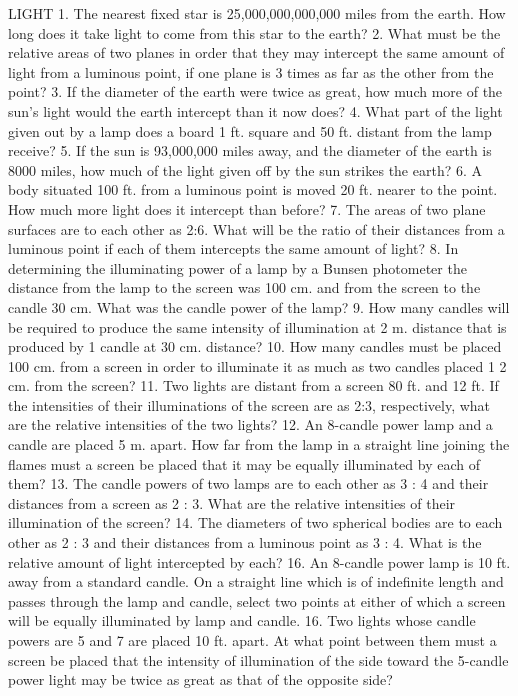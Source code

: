 LIGHT
1. The nearest fixed star is 25,000,000,000,000 miles from the earth. How long does it take light to come from this star to the earth?
2. What must be the relative areas of two planes in order that they may intercept the same amount of light from a luminous point, if one plane is 3 times as far as the other from the point?
3. If the diameter of the earth were twice as great, how much more of the sun's light would the earth intercept than it now does?
4. What part of the light given out by a lamp does a board 1 ft. square and 50 ft. distant from the lamp receive?
5. If the sun is 93,000,000 miles away, and the diameter of the earth is 8000 miles, how much of the light given off by the sun strikes the earth?
6. A body situated 100 ft. from a luminous point is moved 20 ft. nearer to the point. How much more light does it intercept than before?
7. The areas of two plane surfaces are to each other as 2:6. What will be the ratio of their distances from a luminous point if each of them intercepts the same amount of light?
8. In determining the illuminating power of a lamp by a Bunsen photometer the distance from the lamp to the screen was 100 cm. and from the screen to the candle 30 cm. What was the candle power of the lamp?
9. How many candles will be required to produce the same intensity of illumination at 2 m. distance that is produced by 1 candle at 30 cm. distance?
10. How many candles must be placed 100 cm. from a screen in order to illuminate it as much as two candles placed 1 2 cm. from the screen?
11. Two lights are distant from a screen 80 ft. and 12 ft. If the intensities of their illuminations of the screen are as 2:3, respectively, what are the relative intensities of the two lights?
12. An 8-candle power lamp and a candle are placed 5 m. apart. How far from the lamp in a straight line joining the flames must a screen be placed that it may be equally illuminated by each of them?
13. The candle powers of two lamps are to each other as 3 : 4 and their distances from a screen as 2 : 3. What are the relative intensities of their illumination of the screen?
14. The diameters of two spherical bodies are to each other as 2 : 3 and their distances from a luminous point as 3 : 4. What is the relative amount of light intercepted by each?
16. An 8-candle power lamp is 10 ft. away from a standard candle. On a straight line which is of indefinite length and passes through the lamp and candle, select two points at either of which a screen will be equally illuminated by lamp and candle.
16. Two lights whose candle powers are 5 and 7 are placed 10 ft. apart. At what point between them must a screen be placed that the intensity of illumination of the side toward the 5-candle power light may be twice as great as that of the opposite side?
